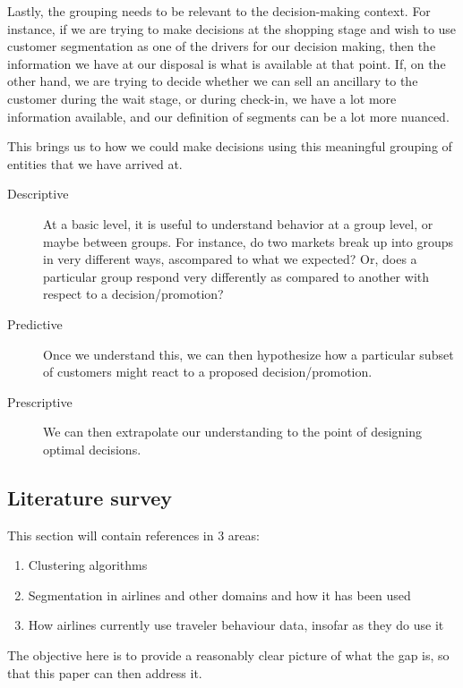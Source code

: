 Lastly, the grouping needs to be relevant to the decision-making context. For instance, if we are trying to make decisions at the shopping stage and wish to use customer segmentation as one of the drivers for our decision making, then the information we have at our disposal is what is available at that point. If, on the other hand, we are trying to decide whether we can sell an ancillary to the customer during the wait stage, or during check-in, we have a lot more information available, and our definition of segments can be a lot more nuanced.

This brings us to how we could make decisions using this meaningful grouping of entities that we have arrived at. 

\begin{description}
\item[Descriptive] At a basic level, it is useful to understand behavior at a group level, or maybe between groups. For instance, do two markets break up into groups in very different ways, ascompared to what we expected? Or, does a particular group respond very differently as compared to another with respect to a decision/promotion? 

\item[Predictive] Once we understand this, we can then hypothesize how a particular subset of customers might react to a proposed decision/promotion. 

\item[Prescriptive] We can then extrapolate our understanding to the point of designing optimal 
decisions.
\end{description}

\subsection{Literature survey}
\label{sec:lit}

This section will contain references in 3 areas: 

\begin{enumerate}
\item Clustering algorithms
\item Segmentation in airlines and other domains and how it has been used
\item How airlines currently use traveler behaviour data, insofar as they do use it
\end{enumerate}

The objective here is to provide a reasonably clear picture of what the gap is, so that this paper can then address it.

